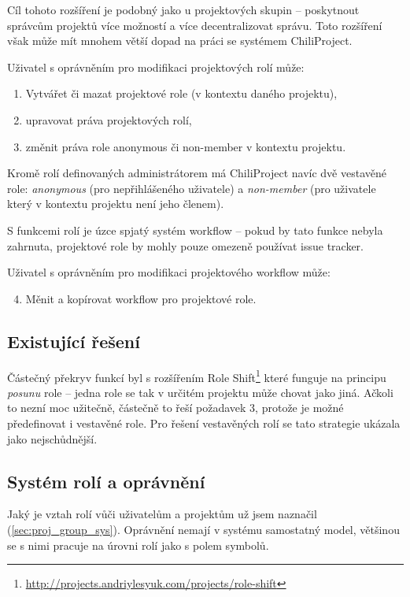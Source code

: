 \documentclass[thesis=B,czech]{FITthesis}[2012/05/02]
\begin{document}
Cíl tohoto rozšíření je podobný jako u projektových skupin -- poskytnout
správcům projektů více možností a více decentralizovat správu. Toto
rozšíření však může mít mnohem větší dopad na práci se systémem
ChiliProject.

Uživatel s oprávněním pro modifikaci projektových rolí může:

\begin{enumerate}[1.]
\item
  Vytvářet či mazat projektové role (v kontextu daného projektu),
\item
  upravovat práva projektových rolí,
\item
  změnit práva role anonymous či non-member v kontextu projektu.
\end{enumerate}
Kromě rolí definovaných administrátorem má ChiliProject navíc dvě
vestavěné role: \emph{anonymous} (pro nepřihlášeného uživatele) a
\emph{non-member} (pro uživatele který v kontextu projektu není jeho
členem).

S funkcemi rolí je úzce spjatý systém \gls{workflow} -- pokud by tato
funkce nebyla zahrnuta, projektové role by mohly pouze omezeně používat
issue tracker.

Uživatel s oprávněním pro modifikaci projektového \gls{workflow} může:

\begin{enumerate}[1.]
\setcounter{enumi}{3}
\item
  Měnit a kopírovat workflow pro projektové role.
\end{enumerate}
\subsection{Existující řešení}

Částečný překryv funkcí byl s rozšířením Role Shift\footnote{\url{http://projects.andriylesyuk.com/projects/role-shift}}
které funguje na principu \emph{posunu} role -- jedna role se tak v
určitém projektu může chovat jako jiná. Ačkoli to nezní moc užitečně,
částečně to řeší požadavek 3, protože je možné předefinovat i vestavěné
role. Pro řešení vestavěných rolí se tato strategie ukázala jako
nejschůdnější.

\subsection{Systém rolí a oprávnění}

Jaký je vztah rolí vůči uživatelům a projektům už jsem naznačil
(\ref{sec:proj_group_sys}). Oprávnění nemají v systému samostatný model,
většinou se s nimi pracuje na úrovni rolí jako s polem symbolů.
\end{document}
